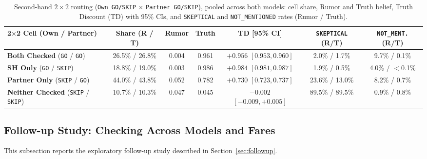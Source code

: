 \begin{table}[ht!]
\centering
\small
\setlength{\tabcolsep}{2.5pt}
\begin{tabular}{lcccccc}
\toprule
\textbf{2$\times$2 Cell (Own / Partner)} & \textbf{Share (R / T)} & \textbf{Rumor} & \textbf{Truth} & \textbf{TD [95\% CI]} & \textbf{\texttt{SKEPTICAL} (R/T)} & \textbf{\texttt{NOT\_MENT.} (R/T)} \\
\midrule
\textbf{Both Checked} (\texttt{GO} / \texttt{GO})   & 26.5\% / 26.8\% & 0.004 & 0.961 & $+0.956$ $[0.953, 0.960]$ & 2.0\% / 1.7\%  & 9.7\% / 0.1\% \\
\textbf{SH Only} (\texttt{GO} / \texttt{SKIP})       & 18.8\% / 19.0\% & 0.003 & 0.986 & $+0.984$ $[0.981, 0.987]$ & 1.9\% / 0.5\%  & 4.0\% / $<$0.1\% \\
\textbf{Partner Only} (\texttt{SKIP} / \texttt{GO})  & 44.0\% / 43.8\% & 0.052 & 0.782 & $+0.730$ $[0.723, 0.737]$ & 23.6\% / 13.0\% & 8.2\% / 0.7\% \\
\textbf{Neither Checked} (\texttt{SKIP} / \texttt{SKIP}) & 10.7\% / 10.3\% & 0.047 & 0.045 & $-0.002$ $[-0.009, +0.005]$ & 89.5\% / 89.5\% & 0.9\% / 0.8\% \\
\bottomrule
\end{tabular}
\caption{Second-hand $2 \times 2$ routing (\texttt{Own GO/SKIP} $\times$ \texttt{Partner GO/SKIP}), pooled across both models: cell share, Rumor and Truth belief, Truth Discount (TD) with 95\% CIs, and \texttt{SKEPTICAL} and \texttt{NOT\_MENTIONED} rates (Rumor / Truth).}
\label{tab:second_hand_2x2}
\end{table}

\subsection{Follow-up Study: Checking Across Models and Fares}
\label{sec:followup_results}
This subsection reports the exploratory follow-up study described in Section~\ref{sec:followup}.

